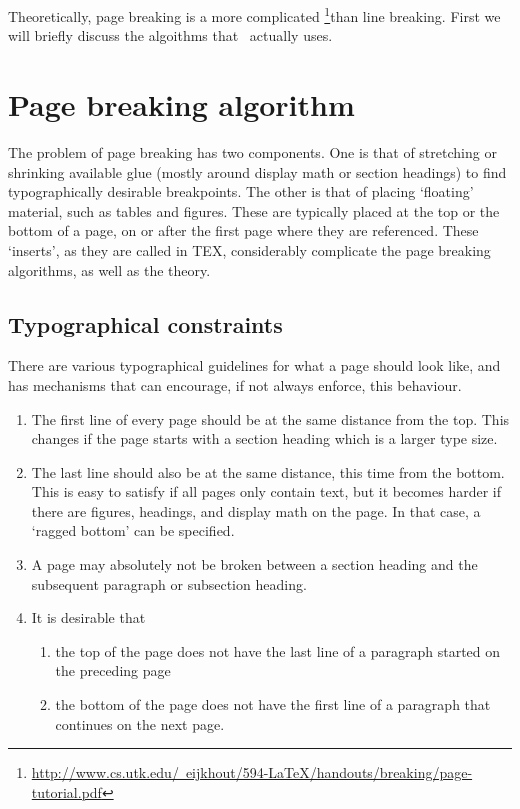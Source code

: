 Theoretically, page breaking is a more complicated \footnote{\href{test}{http://www.cs.utk.edu/~eijkhout/594-LaTeX/handouts/breaking/page-tutorial.pdf}}than line breaking. First we will briefly discuss the algoithms that \tex\ actually
uses.


\section{Page breaking algorithm}

The problem of page breaking has two components. One is that of stretching or shrinking
available glue (mostly around display math or section headings) to find typographically
desirable breakpoints. The other is that of placing ‘floating’ material, such as tables and
figures. These are typically placed at the top or the bottom of a page, on or after the first
page where they are referenced. These ‘inserts’, as they are called in TEX, considerably
complicate the page breaking algorithms, as well as the theory.

\subsection{Typographical constraints}

There are various typographical guidelines for what a page should look like, and \tex has
mechanisms that can encourage, if not always enforce, this behaviour.

\begin{enumerate}
\item The first line of every page should be at the same distance from the top. This changes
if the page starts with a section heading which is a larger type size.

\item The last line should also be at the same distance, this time from the bottom. This
is easy to satisfy if all pages only contain text, but it becomes harder if there are
figures, headings, and display math on the page. In that case, a ‘ragged bottom’ can
be specified.

\item  A page may absolutely not be broken between a section heading and the subsequent
paragraph or subsection heading.

\item It is desirable that

\begin{enumerate}
\item the top of the page does not have the last line of a paragraph started on the
preceding page

\item the bottom of the page does not have the first line of a paragraph that continues
on the next page.
\end{enumerate}

\end{enumerate}



